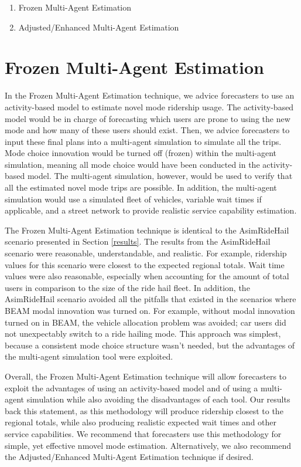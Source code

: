 \documentclass[12pt, oneside, openright]{byuthesis}
\providecommand{\tightlist}{%
  \setlength{\itemsep}{0pt}\setlength{\parskip}{0pt}}
\begin{document}
\begin{enumerate}
\def\labelenumi{\arabic{enumi}.}
\tightlist
\item
  Frozen Multi-Agent Estimation
\item
  Adjusted/Enhanced Multi-Agent Estimation
\end{enumerate}

\hypertarget{frozen-multi-agent-estimation}{%
\section{Frozen Multi-Agent Estimation}\label{frozen-multi-agent-estimation}}

In the Frozen Multi-Agent Estimation technique, we advice forecasters to use an activity-based model to estimate novel mode ridership usage. The activity-based model would be in charge of forecasting which users are prone to using the new mode and how many of these users should exist. Then, we advice forecasters to input these final plans into a multi-agent simulation to simulate all the trips. Mode choice innovation would be turned off (frozen) within the multi-agent simulation, meaning all mode choice would have been conducted in the activity-based model. The multi-agent simulation, however, would be used to verify that all the estimated novel mode trips are possible. In addition, the multi-agent simulation would use a simulated fleet of vehicles, variable wait times if applicable, and a street network to provide realistic service capability estimation.

The Frozen Multi-Agent Estimation technique is identical to the AsimRideHail scenario presented in Section \ref{results}. The results from the AsimRideHail scenario were reasonable, understandable, and realistic. For example, ridership values for this scenario were closest to the expected regional totals. Wait time values were also reasonable, especially when accounting for the amount of total users in comparison to the size of the ride hail fleet. In addition, the AsimRideHail scenario avoided all the pitfalls that existed in the scenarios where BEAM modal innovation was turned on. For example, without modal innovation turned on in BEAM, the vehicle allocation problem was avoided; car users did not unexpectably switch to a ride hailing mode. This approach was simplest, because a consistent mode choice structure wasn't needed, but the advantages of the multi-agent simulation tool were exploited.

Overall, the Frozen Multi-Agent Estimation technique will allow forecasters to exploit the advantages of using an activity-based model and of using a multi-agent simulation while also avoiding the disadvantages of each tool. Our results back this statement, as this methodology will produce ridership closest to the regional totals, while also producing realistic expected wait times and other service capabilities. We recommend that forecasters use this methodology for simple, yet effective nmovel mode estimation. Alternatively, we also recommend the Adjusted/Enhanced Multi-Agent Estimation technique if desired.
\end{document}
